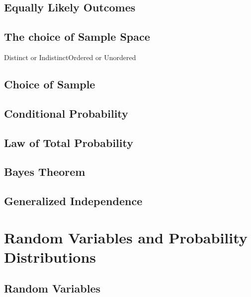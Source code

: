 \documentclass{article}
\begin{document}
    \subsection{Equally Likely Outcomes}
    \subsection{The choice of Sample Space}
    Distinct or Indistinct\newline Ordered or Unordered
    \subsection{Choice of Sample}
    \subsection{Conditional Probability}
    \subsection{Law of Total Probability}
    \subsection{Bayes Theorem}
    \subsection{Generalized Independence}
    \section{Random Variables and Probability Distributions}
    \subsection{Random Variables}
\end{document}
